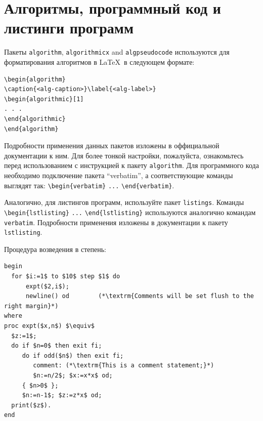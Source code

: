 \documentclass[pdflatex,sn-mathphys-gost]{pmi-jnl}
\begin{document}
\section{Алгоритмы, программный код и листинги программ}\label{sec7}

Пакеты \verb+algorithm+, \verb+algorithmicx+ and \verb+algpseudocode+ используются для форматирования алгоритмов в \LaTeX\ в следующем формате:

\bigskip
\begin{verbatim}
\begin{algorithm}
\caption{<alg-caption>}\label{<alg-label>}
\begin{algorithmic}[1]
. . .
\end{algorithmic}
\end{algorithm}
\end{verbatim}
\bigskip

Подробности применения данных пакетов изложены в оффициальной документации к ним. Для более тонкой настройки, пожалуйста, ознакомьтесь перед использованием с инструкцией к пакету \verb+algorithm+. Для программного кода необходимо подключение пакета ``verbatim'', а соответствующие команды выглядят так: \verb+\begin{verbatim}+ \verb+...+ \verb+\end{verbatim}+. 

Аналогично, для листингов программ, используйте пакет \verb+listings+. Команды \verb+\begin{lstlisting}+ \verb+...+ \verb+\end{lstlisting}+ используются аналогично командам \verb+verbatim+. Подробности применения изложены в документации к пакету \verb+lstlisting+.

Процедура возведения в степень:

\begin{lstlisting}
begin
  for $i:=1$ to $10$ step $1$ do
      expt($2,i$);  
      newline() od        (*\textrm{Comments will be set flush to the right margin}*)
where
proc expt($x,n$) $\equiv$
  $z:=1$;
  do if $n=0$ then exit fi;
     do if odd($n$) then exit fi;                 
        comment: (*\textrm{This is a comment statement;}*)
        $n:=n/2$; $x:=x*x$ od;
     { $n>0$ };
     $n:=n-1$; $z:=z*x$ od;
  print($z$). 
end
\end{lstlisting}
\end{document}
